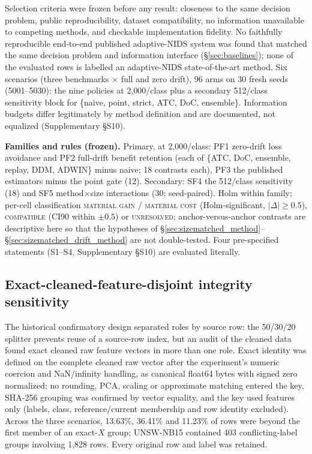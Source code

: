 \documentclass[a4paper,fleqn]{cas-sc}
\begin{document}
Selection criteria were frozen before any result: closeness to the same decision problem, public reproducibility, dataset compatibility, no information unavailable to competing methods, and checkable implementation fidelity. No faithfully reproducible end-to-end published adaptive-NIDS system was found that matched the same decision problem and information interface (\S\ref{sec:baselines}); none of the evaluated rows is labelled an adaptive-NIDS state-of-the-art method. Six scenarios (three benchmarks $\times$ full and zero drift), 96 arms on 30 fresh seeds (5001--5030): the nine policies at 2{,}000/class plus a secondary 512/class sensitivity block for \{naive, point, strict, ATC, DoC, ensemble\}. Information budgets differ legitimately by method definition and are documented, not equalized (Supplementary \S S10).

\textbf{Families and rules (frozen).} Primary, at 2{,}000/class: PF1 zero-drift loss avoidance and PF2 full-drift benefit retention (each of \{ATC, DoC, ensemble, replay, DDM, ADWIN\} minus naive; 18 contrasts each), PF3 the published estimators minus the point gate (12). Secondary: SF4 the 512/class sensitivity (18) and SF5 method$\times$size interactions (30; seed-paired). Holm within family; per-cell classification \textsc{material gain} / \textsc{material cost} (Holm-significant, $|\Delta| \ge 0.5$), \textsc{compatible} (CI90 within $\pm0.5$) or \textsc{unresolved}; anchor-versus-anchor contrasts are descriptive here so that the hypotheses of \S\ref{sec:sizematched_method}--\S\ref{sec:sizematched_drift_method} are not double-tested. Four pre-specified statements (S1--S4, Supplementary \S S10) are evaluated literally.

\subsection{Exact-cleaned-feature-disjoint integrity sensitivity}
\label{sec:value_disjoint_method}

The historical confirmatory design separated roles by source row: the 50/30/20 splitter prevents reuse of a source-row index, but an audit of the cleaned data found exact cleaned raw feature vectors in more than one role. Exact identity was defined on the complete cleaned raw vector after the experiment's numeric coercion and NaN/infinity handling, as canonical float64 bytes with signed zero normalized; no rounding, PCA, scaling or approximate matching entered the key, SHA-256 grouping was confirmed by vector equality, and the key used features only (labels, class, reference/current membership and row identity excluded). Across the three scenarios, 13.63\%, 36.41\% and 11.23\% of rows were beyond the first member of an exact-$X$ group; UNSW-NB15 contained 403 conflicting-label groups involving 1{,}828 rows. Every original row and label was retained.
\end{document}
